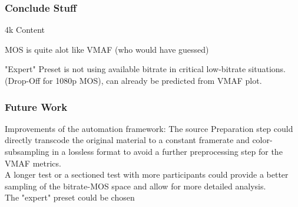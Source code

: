 \subsubsection{Conclude Stuff}
4k Content

MOS is quite alot like VMAF (who would have guessed)


"Expert" Preset is not using available bitrate in critical low-bitrate situations. (Drop-Off for 1080p MOS), can already be predicted from VMAF plot.


\subsubsection{Future Work}
Improvements of the automation framework: The source Preparation step could directly transcode the original material to a constant framerate and color-subsampling in a lossless format to avoid a further preprocessing step for the VMAF metrics.\\

A longer test or a sectioned test with more participants could provide a better sampling of the bitrate-MOS space and allow for more detailed analysis.\\

The "expert" preset could be chosen 